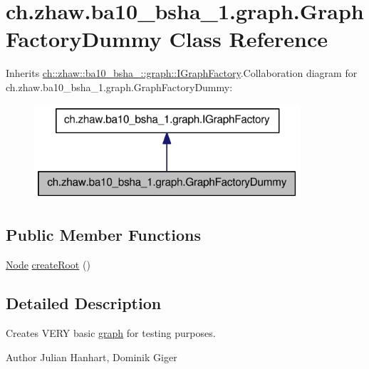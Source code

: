 \hypertarget{classch_1_1zhaw_1_1ba10__bsha__1_1_1graph_1_1GraphFactoryDummy}{
\section{ch.zhaw.ba10\_\-bsha\_\-1.graph.GraphFactoryDummy Class Reference}
\label{classch_1_1zhaw_1_1ba10__bsha__1_1_1graph_1_1GraphFactoryDummy}
}


Inherits \hyperlink{interfacech_1_1zhaw_1_1ba10__bsha__1_1_1graph_1_1IGraphFactory}{ch::zhaw::ba10\_\-bsha\_::graph::IGraphFactory}.Collaboration diagram for ch.zhaw.ba10\_\-bsha\_\-1.graph.GraphFactoryDummy:\nopagebreak
\begin{figure}[H]
\begin{center}
\leavevmode
\includegraphics[width=280pt]{classch_1_1zhaw_1_1ba10__bsha__1_1_1graph_1_1GraphFactoryDummy__coll__graph}
\end{center}
\end{figure}
\subsection*{Public Member Functions}
\begin{DoxyCompactItemize}
\item 
\hyperlink{classch_1_1zhaw_1_1ba10__bsha__1_1_1graph_1_1Node}{Node} \hyperlink{classch_1_1zhaw_1_1ba10__bsha__1_1_1graph_1_1GraphFactoryDummy_aee963953d9d848498caf25bf30cbe8bf}{createRoot} ()
\end{DoxyCompactItemize}


\subsection{Detailed Description}
Creates VERY basic \hyperlink{namespacech_1_1zhaw_1_1ba10__bsha__1_1_1graph}{graph} for testing purposes.

\begin{DoxyAuthor}{Author}
Julian Hanhart, Dominik Giger 
\end{DoxyAuthor}



